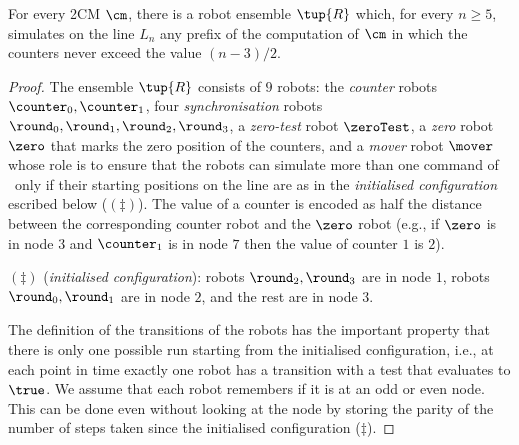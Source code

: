 \begin{theorem} \label{thm:PVPundec}
For every 2CM $\cm$, there is a robot ensemble $\tup{R}$ which, for every $n \geq 5$, simulates on the line $L_n$ any prefix of the computation of $\cm$ in which the counters never exceed the value $(n-3)/2$.
\end{theorem}
\begin{proof}
The ensemble $\tup{R}$ consists of $9$ robots: the {\em counter} robots $\counter_0, \counter_1$, four {\em synchronisation} robots $\round_0,\round_1,\round_2,\round_3$, a {\em zero-test} robot $\zeroTest$, a {\em zero} robot $\zero$ that marks the zero position of the counters, and a {\em mover} robot $\mover$ whose role is to ensure that the robots can simulate more than one command of \cm\ only if their starting positions on the line are as in the {\em initialised configuration} escribed below ($(\ddagger)$). The value of a counter is encoded as half the distance between the corresponding counter robot and the $\zero$ robot (e.g., if $\zero$ is in node $3$ and $\counter_1$ is in node $7$ then the value of counter $1$ is $2$).


$(\ddagger)$ ({\em initialised configuration}):
robots $\round_2, \round_3$ are in node $1$, robots $\round_0,\round_1$ are in node $2$, and the rest are in node $3$.

The definition of the transitions of the robots has the important property that there is only one possible run starting from the initialised configuration, i.e., at each point in time exactly one robot has a transition with a test that evaluates to $\true$. We assume that each robot remembers if it is at an odd or even node. This can be done even without looking at the node by storing the parity of the number of steps taken since the initialised configuration ($\ddagger$).


\end{proof}
